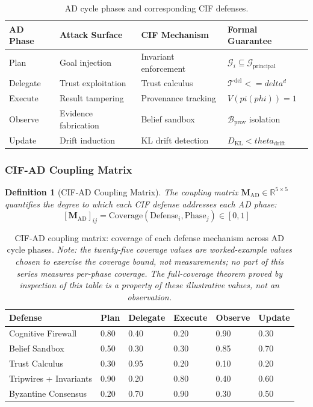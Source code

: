 \documentclass[
]{article}
\newtheorem{definition}{Definition}[section]
\begin{document}
\begin{table}[htbp]
\centering
\caption{AD cycle phases and corresponding CIF defenses.}
\label{tab:ad-cif-mapping}
\begin{tabular}{@{}lllp{4cm}@{}}
\toprule
AD Phase & Attack Surface & CIF Mechanism & Formal Guarantee \\
\midrule
Plan & Goal injection & Invariant enforcement & $\mathcal{G}_i \subseteq \mathcal{G}_{\text{principal}}$ \\
Delegate & Trust exploitation & Trust calculus & $\mathcal{T}^{\text{del}} <= delta^d$ \\
Execute & Result tampering & Provenance tracking & $V(pi(phi)) = 1$ \\
Observe & Evidence fabrication & Belief sandbox & $\mathcal{B}_{\text{prov}}$ isolation \\
Update & Drift induction & KL drift detection & $D_{\text{KL}} < theta_{\text{drift}}$ \\
\bottomrule
\end{tabular}
\end{table}

\subsubsection{CIF-AD Coupling Matrix}\label{cif-ad-coupling-matrix}

\begin{definition}[CIF-AD Coupling Matrix]
\label{def:cif-ad-matrix}
The coupling matrix $\mathbf{M}_{\text{AD}} \in \mathbb{R}^{5 \times 5}$ quantifies the degree to which each CIF defense addresses each AD phase:
\begin{equation}
\label{eq:cif-ad-matrix}
[\mathbf{M}_{\text{AD}}]_{ij} = \text{Coverage}(\text{Defense}_i, \text{Phase}_j) \in [0,1]
\end{equation}
\end{definition}

\begin{table}[htbp]
\centering
\caption{CIF-AD coupling matrix: coverage of each defense mechanism across AD cycle phases. \textit{Note: the twenty-five coverage values are worked-example values chosen to exercise the coverage bound, not measurements; no part of this series measures per-phase coverage. The full-coverage theorem proved by inspection of this table is a property of these illustrative values, not an observation.}}
\label{tab:cif-ad-matrix}
\begin{tabular}{@{}llllll@{}}
\toprule
Defense & Plan & Delegate & Execute & Observe & Update \\
\midrule
Cognitive Firewall & 0.80 & 0.40 & 0.20 & 0.90 & 0.30 \\
Belief Sandbox & 0.50 & 0.30 & 0.30 & 0.85 & 0.70 \\
Trust Calculus & 0.30 & 0.95 & 0.20 & 0.10 & 0.20 \\
Tripwires + Invariants & 0.90 & 0.20 & 0.80 & 0.40 & 0.60 \\
Byzantine Consensus & 0.20 & 0.70 & 0.90 & 0.30 & 0.50 \\
\bottomrule
\end{tabular}
\end{table}
\end{document}
